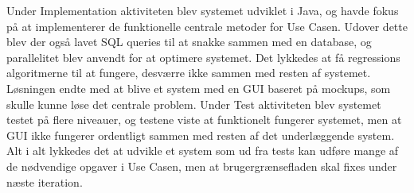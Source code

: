 Under Implementation aktiviteten blev systemet udviklet i Java, og havde fokus på at implementerer de funktionelle centrale metoder for Use Casen. Udover dette blev der også lavet SQL queries til at snakke sammen med en database, og parallelitet blev anvendt for at optimere systemet. Det lykkedes at få regressions algoritmerne til at fungere, desværre ikke sammen med resten af systemet.
Løsningen endte med at blive et system med en GUI baseret på mockups, som skulle kunne løse det centrale problem. Under Test aktiviteten blev systemet testet på flere niveauer, og testene viste at funktionelt fungerer systemet, men at GUI ikke fungerer ordentligt sammen med resten af det underlæggende system. 
Alt i alt lykkedes det at udvikle et system som ud fra tests kan udføre mange af de nødvendige opgaver i Use Casen, men at brugergrænsefladen skal fixes under næste iteration.


